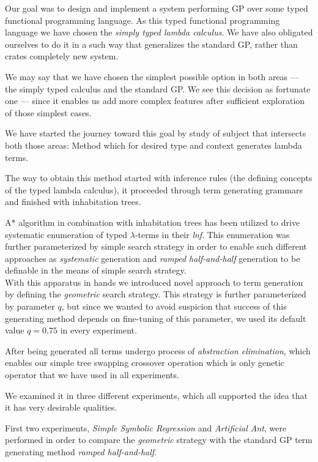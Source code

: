 \documentclass[conference]{IEEEtran}
\newcommand{\lterms}{$\lambda$-terms\xspace}
\newcommand{\lnf}{\textit{lnf}\xspace}
\begin{document}
Our goal was to design and implement a system
performing GP over some typed functional programming language.
As this typed functional programming language we have chosen the 
\textit{simply typed lambda calculus}.
We have also obligated ourselves to do it in a such way that 
generalizes the standard GP, rather than
crates completely new system.

We may say that we have chosen the simplest possible
option in both areas --- the simply typed calculus and the standard GP.
We see this decision as fortunate one --- since it enables us add more
complex features after sufficient exploration of those simplest cases.
   
We have started the journey toward this goal by study 
of subject that intersects both those areas:
Method which for desired type and context generates lambda terms.  

The way to obtain this method started with inference rules 
(the defining concepts of the typed lambda calculus),
it proceeded through term generating grammars and finished 
with inhabitation trees.

A* algorithm in combination with inhabitation trees
has been utilized to drive systematic enumeration
of typed \lterms in their \lnf. This enumeration was further 
parameterized by simple search strategy in order to enable
such different approaches as \textit{systematic} generation 
and \textit{ramped half-and-half} generation to be definable
in the means of simple search strategy.\\

With this apparatus in hands we introduced novel approach
to term generation by defining the \textit{geometric} search 
strategy. This strategy is further parameterized by parameter
$q$,  but since we wanted to avoid suspicion that success
of this generating method depends on fine-tuning of this
parameter, we used its default value $q = 0.75$ in every experiment.

After being generated all terms undergo process of \textit{abstraction
elimination}, which enables our simple tree swapping crossover operation
which is only genetic operator that we have used in all experiments.

We examined it in three different experiments, which all 
supported the idea that it has very desirable qualities.

First two experiments, \textit{Simple Symbolic Regression} and 
\textit{Artificial Ant}, were performed in order to compare
the \textit{geometric} strategy with the standard GP term 
generating method \textit{ramped half-and-half}. 
\end{document}
